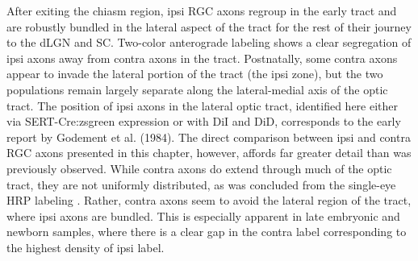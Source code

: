 After exiting the chiasm region, ipsi RGC axons regroup in the early tract and are robustly bundled in the lateral aspect of the tract for the rest of their journey to the dLGN and SC.
Two-color anterograde labeling shows a clear segregation of ipsi axons away from contra axons in the tract.
Postnatally, some contra axons appear to invade the lateral portion of the tract (the ipsi zone), but the two populations remain largely separate along the lateral-medial axis of the optic tract.
The position of ipsi axons in the lateral optic tract, identified here either via SERT-Cre:zsgreen expression or with DiI and DiD, corresponds to the early report by Godement et al. (1984).
The direct comparison between ipsi and contra RGC axons presented in this chapter, however, affords far greater detail than was previously observed.
While contra axons do extend through much of the optic tract, they are not uniformly distributed, as was concluded from the single-eye HRP labeling \cite{godement1984prenatal}.
Rather, contra axons seem to avoid the lateral region of the tract, where ipsi axons are bundled.
This is especially apparent in late embryonic and newborn samples, where there is a clear gap in the contra label corresponding to the highest density of ipsi label. 

